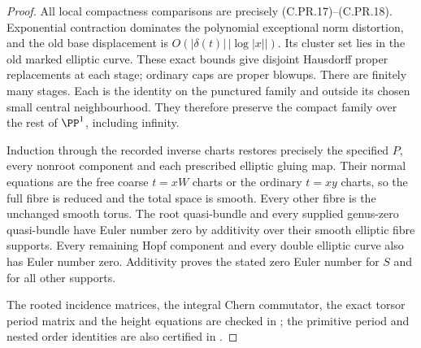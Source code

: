 \begin{proof}
All local compactness comparisons
are precisely (C.PR.17)--(C.PR.18).
Exponential contraction dominates
the polynomial exceptional norm
distortion, and the old base
displacement is
$O(|\delta(t)|\,|\log|x||)$.
Its cluster set lies in the old
marked elliptic curve. These exact
bounds give disjoint Hausdorff
proper replacements at each stage;
ordinary caps are proper blowups.
There are finitely many stages.
Each is the identity on the
punctured family and outside its
chosen small central neighbourhood.
They therefore preserve the
compact family over the rest of
$\PP^1$, including infinity.

Induction through the recorded
inverse charts restores precisely
the specified $P$, every nonroot
component and each prescribed
elliptic gluing map. Their normal
equations are the free coarse
$t=xW$ charts or the ordinary
$t=xy$ charts, so the full fibre
is reduced and the total space
is smooth. Every other fibre is
the unchanged smooth torus.
The root quasi-bundle and every supplied
genus-zero quasi-bundle have Euler number
zero by additivity over their smooth
elliptic fibre supports. Every remaining
Hopf component and every double elliptic
curve also has Euler number zero. Additivity proves
the stated zero Euler number
for $S$ and for all other supports.

The rooted incidence matrices,
the integral Chern commutator,
the exact torsor period matrix
and the height equations are
checked in
;
the primitive period and nested
order identities are also
certified in
.
\end{proof}
